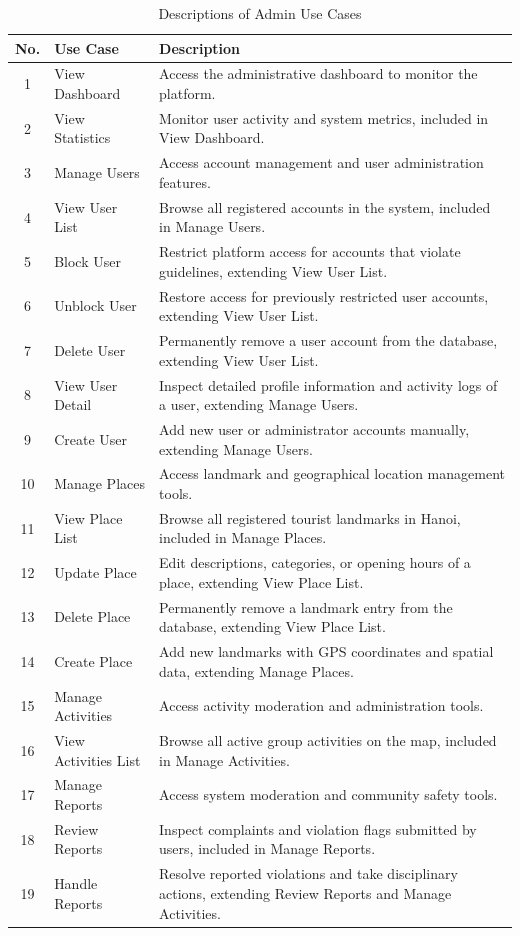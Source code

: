 \documentclass[a4paper,12pt]{report}
\begin{document}
\newpage
\begin{table}[H]
\centering
\small
\renewcommand{\arraystretch}{1.1}
\begin{tabular}{|c|p{4.5cm}|p{9cm}|}
\hline
\textbf{No.} & \textbf{Use Case} & \textbf{Description} \\ \hline
1 & View Dashboard & Access the administrative dashboard to monitor the platform. \\ \hline
2 & View Statistics & Monitor user activity and system metrics, included in View Dashboard. \\ \hline
3 & Manage Users & Access account management and user administration features. \\ \hline
4 & View User List & Browse all registered accounts in the system, included in Manage Users. \\ \hline
5 & Block User & Restrict platform access for accounts that violate guidelines, extending View User List. \\ \hline
6 & Unblock User & Restore access for previously restricted user accounts, extending View User List. \\ \hline
7 & Delete User & Permanently remove a user account from the database, extending View User List. \\ \hline
8 & View User Detail & Inspect detailed profile information and activity logs of a user, extending Manage Users. \\ \hline
9 & Create User & Add new user or administrator accounts manually, extending Manage Users. \\ \hline
10 & Manage Places & Access landmark and geographical location management tools. \\ \hline
11 & View Place List & Browse all registered tourist landmarks in Hanoi, included in Manage Places. \\ \hline
12 & Update Place & Edit descriptions, categories, or opening hours of a place, extending View Place List. \\ \hline
13 & Delete Place & Permanently remove a landmark entry from the database, extending View Place List. \\ \hline
14 & Create Place & Add new landmarks with GPS coordinates and spatial data, extending Manage Places. \\ \hline
15 & Manage Activities & Access activity moderation and administration tools. \\ \hline
16 & View Activities List & Browse all active group activities on the map, included in Manage Activities. \\ \hline
17 & Manage Reports & Access system moderation and community safety tools. \\ \hline
18 & Review Reports & Inspect complaints and violation flags submitted by users, included in Manage Reports. \\ \hline
19 & Handle Reports & Resolve reported violations and take disciplinary actions, extending Review Reports and Manage Activities. \\ \hline
\end{tabular}
\caption{Descriptions of Admin Use Cases}
\label{tab:admin_use_cases}
\end{table}
\end{document}
